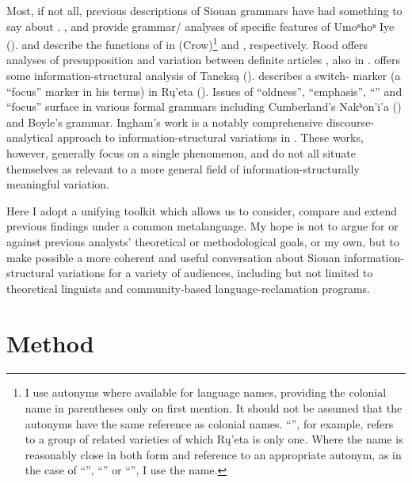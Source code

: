 \documentclass[output=paper]{LSP/langsci}
\begin{document}
	Most, if not all, previous descriptions of Siouan grammars have had something to say about . \citet{Rudin1998}, \citet{Koontz2003} and \citet{Eschenberg2005} provide grammar/ analyses of specific features of Umoⁿhoⁿ Iye (). \citet[242--260]{Graczyk1991a} and \citet{deReuse1994} describe the functions of  in  (Crow)\footnote{I use autonyms where available for language names, providing the  colonial name in parentheses only on first mention. It should not be assumed that the autonyms have the same reference as  colonial names. “”, for example, refers to a group of related varieties of which Rų’eta is only one. Where the  name is reasonably close in both form and reference to an appropriate autonym, as in the case of ``'', ``'' or ``'', I use the  name.} and , respectively. Rood offers analyses of presupposition \citeyearpar{Rood1977} and variation between definite articles \citeyearpar{Rood1985}, also in . \citet{Kaufman2008} offers some information-structural analysis of Taneksą (). \citet{Wolvengrey1991} describes a switch- marker (a “focus” marker in his terms) in Rų’eta (). Issues of “oldness”, “emphasis”, “” and “focus” surface in various formal grammars including Cumberland’s \citeyearpar{Cumberland2005} Nakʰon’i’a () and Boyle’s \citeyearpar{Boyle2007}  grammar. Ingham’s \citeyearpar{Ingham2003} work is a notably comprehensive discourse-analytical approach to information-structural variations in . These works, however, generally focus on a single phenomenon, and do not all situate themselves as relevant to a more general field of information-structurally meaningful variation. 
	
	Here I adopt a unifying toolkit which allows us to consider, compare and extend previous findings under a common metalanguage. My hope is not to argue for or against previous analysts’ theoretical or methodological goals, or my own, but to make possible a more coherent and useful conversation about Siouan information-structural variations for a variety of audiences, including but not limited to theoretical linguists and community-based language-reclamation programs.

\section{Method}
\end{document}
